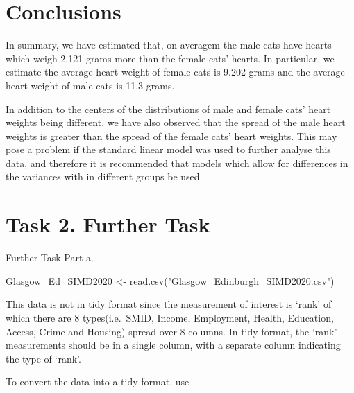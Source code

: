 \documentclass[
]{article}
\newenvironment{Shaded}{\begin{snugshade}}{\end{snugshade}}
\newcommand{\AttributeTok}[1]{\textcolor[rgb]{0.77,0.63,0.00}{#1}}
\newcommand{\FunctionTok}[1]{\textcolor[rgb]{0.00,0.00,0.00}{#1}}
\newcommand{\NormalTok}[1]{#1}
\newcommand{\OtherTok}[1]{\textcolor[rgb]{0.56,0.35,0.01}{#1}}
\newcommand{\SpecialCharTok}[1]{\textcolor[rgb]{0.00,0.00,0.00}{#1}}
\newcommand{\StringTok}[1]{\textcolor[rgb]{0.31,0.60,0.02}{#1}}
\begin{document}
\hypertarget{sec:Conc}{%
\section{Conclusions}\label{sec:Conc}}

In summary, we have estimated that, on averagem the male cats have
hearts which weigh 2.121 grams more than the female cats' hearts. In
particular, we estimate the average heart weight of female cats is 9.202
grams and the average heart weight of male cats is 11.3 grams.

In addition to the centers of the distributions of male and female cats'
heart weights being different, we have also observed that the spread of
the male heart weights is greater than the spread of the female cats'
heart weights. This may pose a problem if the standard linear model was
used to further analyse this data, and therefore it is recommended that
models which allow for differences in the variances with in different
groups be used.

\hypertarget{task-2.-further-task}{%
\section{Task 2. Further Task}\label{task-2.-further-task}}

Further Task Part a.

\begin{Shaded}
\begin{Highlighting}[]
\NormalTok{Glasgow\_Ed\_SIMD2020 }\OtherTok{\textless{}{-}} \FunctionTok{read.csv}\NormalTok{(}\StringTok{"Glasgow\_Edinburgh\_SIMD2020.csv"}\NormalTok{)}
\end{Highlighting}
\end{Shaded}

This data is not in tidy format since the measurement of interest is
`rank' of which there are 8 types(i.e.~SMID, Income, Employment, Health,
Education, Access, Crime and Housing) spread over 8 columns. In tidy
format, the `rank' measurements should be in a single column, with a
separate column indicating the type of `rank'.

To convert the data into a tidy format, use

\begin{Shaded}
\end{Shaded}
\end{document}
